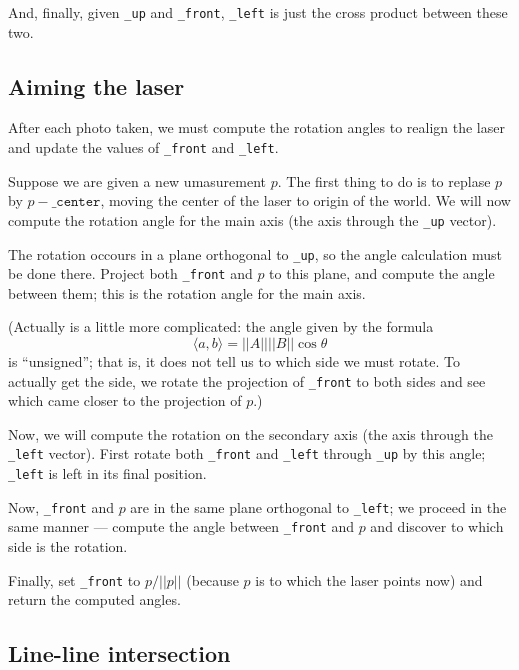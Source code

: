 \documentclass{article}
\newcommand\attribute[1]{\texttt{#1}}
\begin{document}
And, finally, given \attribute{\_up} and \attribute{\_front},
\attribute{\_left} is just the cross product between these two.

\subsection{Aiming the laser}

After each photo taken,
we must compute the rotation angles to realign the laser
and update the values of \attribute{\_front} and \attribute{\_left}.

Suppose we are given a new umasurement $p$.
The first thing to do is to replase $p$ by $p - \attribute{\_center}$,
moving the center of the laser to origin of the world.
We will now compute the rotation angle for the main axis
(the axis through the \attribute{\_up} vector).

The rotation occours in a plane orthogonal to \attribute{\_up},
so the angle calculation must be done there.
Project both \attribute{\_front} and $p$ to this plane,
and compute the angle between them;
this is the rotation angle for the main axis.

(Actually is a little more complicated:
the angle given by the formula
\begin{equation*}
    \langle a, b \rangle = ||A|| ||B|| \cos \theta
\end{equation*}
is ``unsigned''; that is,
it does not tell us to which side we must rotate.
To actually get the side,
we rotate the projection of \attribute{\_front} to both sides
and see which came closer to the projection of $p$.)

Now, we will compute the rotation on the secondary axis
(the axis through the \attribute{\_left} vector).
First rotate both \attribute{\_front} and \attribute{\_left}
through \attribute{\_up} by this angle;
\attribute{\_left} is left in its final position.

Now, \attribute{\_front} and $p$
are in the same plane orthogonal to \attribute{\_left};
we proceed in the same manner
--- compute the angle between \attribute{\_front} and $p$
and discover to which side is the rotation.

Finally, set \attribute{\_front} to $p / ||p||$
(because $p$ is to which the laser points now)
and return the computed angles.

\subsection{Line-line intersection}
\label{sec:line-line-intersection}
\end{document}
